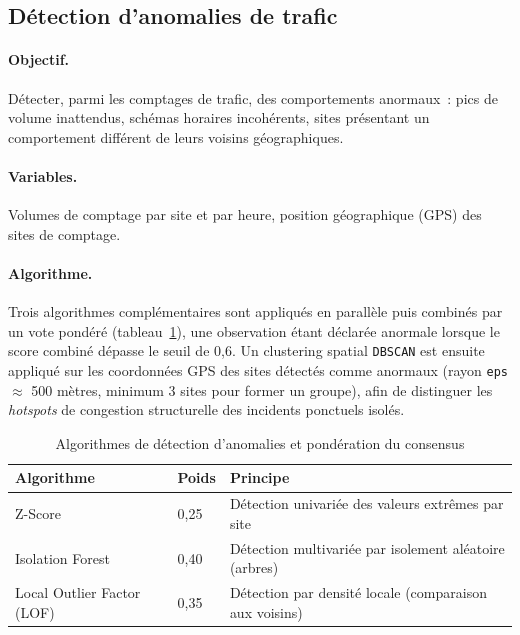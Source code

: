 \subsection{Détection d'anomalies de trafic}

\paragraph{Objectif.} Détecter, parmi les comptages de trafic, des comportements anormaux~: pics de volume inattendus, schémas horaires incohérents, sites présentant un comportement différent de leurs voisins géographiques.

\paragraph{Variables.} Volumes de comptage par site et par heure, position géographique (GPS) des sites de comptage.

\paragraph{Algorithme.} Trois algorithmes complémentaires sont appliqués en parallèle puis combinés par un vote pondéré (tableau~\ref{tab:anomalies_algo}), une observation étant déclarée anormale lorsque le score combiné dépasse le seuil de 0,6. Un clustering spatial \texttt{DBSCAN} est ensuite appliqué sur les coordonnées GPS des sites détectés comme anormaux (rayon \texttt{eps} $\approx$ 500 mètres, minimum 3 sites pour former un groupe), afin de distinguer les \emph{hotspots} de congestion structurelle des incidents ponctuels isolés.

\begin{table}[H]
\centering
\caption{Algorithmes de détection d'anomalies et pondération du consensus}
\label{tab:anomalies_algo}
\begin{tabular}{p{3cm}p{2cm}p{8cm}}
\toprule
\textbf{Algorithme} & \textbf{Poids} & \textbf{Principe} \\
\midrule
Z-Score & 0,25 & Détection univariée des valeurs extrêmes par site \\
Isolation Forest & 0,40 & Détection multivariée par isolement aléatoire (arbres) \\
Local Outlier Factor (LOF) & 0,35 & Détection par densité locale (comparaison aux voisins) \\
\bottomrule
\end{tabular}
\end{table}

